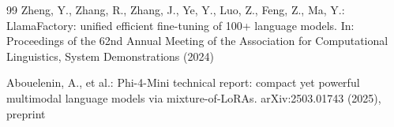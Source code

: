 \documentclass[runningheads,a4paper]{llncs}
\begin{document}
\begin{thebibliography}{99}
Zheng, Y., Zhang, R., Zhang, J., Ye, Y., Luo, Z., Feng, Z., Ma, Y.: LlamaFactory: unified
efficient fine-tuning of 100+ language models. In: Proceedings of the 62nd Annual Meeting of the
Association for Computational Linguistics, System Demonstrations (2024)

Abouelenin, A., et al.: Phi-4-Mini technical report: compact yet powerful multimodal language
models via mixture-of-LoRAs. arXiv:2503.01743 (2025), preprint

\end{thebibliography}
\end{document}
